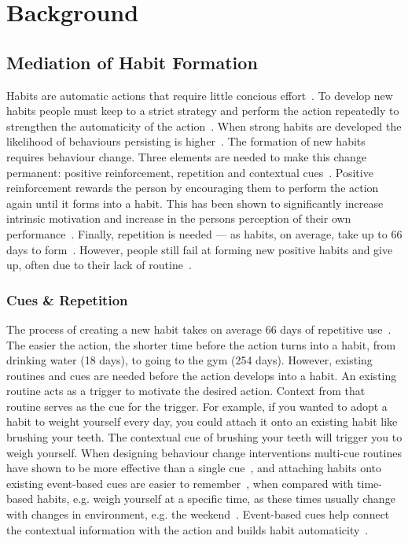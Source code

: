 \documentclass{scaffold/sigchi}
\begin{document}
\section{Background}
\subsection{Mediation of Habit Formation}
Habits are automatic actions that require little concious effort~\cite{article_the_habitual_consumer}. To develop new habits people must keep to a strict strategy and perform the action repeatedly to strengthen the automaticity of the action~\cite{article_promoting_habit_formation}. When strong habits are developed the likelihood of behaviours persisting is higher~\cite{putting_habit_into_practice}. The formation of new habits requires behaviour change. Three elements are needed to make this change permanent: positive reinforcement, repetition and contextual cues~\cite{article_experiences_of_habit_formation}. Positive reinforcement rewards the person by encouraging them to perform the action again until it forms into a habit. This has been shown to significantly increase intrinsic motivation and increase in the persons perception of their own performance~\cite{positive_reinforcement_pro}. Finally, repetition is needed --- as habits, on average, take up to 66 days to form~\cite{article_how_habits_formed_modelling_habit_formation}.
However, people still fail at forming new positive habits and give up, often due to their lack of routine~\cite{article_promoting_habit_formation, article_the_habitual_consumer}.



\subsubsection{Cues \& Repetition}
The process of creating a new habit takes on average 66 days of repetitive use~\cite{article_how_habits_formed_modelling_habit_formation}. The easier the action, the shorter time before the action turns into a habit, from drinking water (18 days), to going to the gym (254 days). However, existing routines and cues are needed before the action develops into a habit. An existing routine acts as a trigger to motivate the desired action. Context from that routine serves as the cue for the trigger. For example, if you wanted to adopt a habit to weight yourself every day, you could attach it onto an existing habit like brushing your teeth. The contextual cue of brushing your teeth will trigger you to weigh yourself. When designing behaviour change interventions multi-cue routines have shown to be more effective than a single cue~\cite{article_understanding_use_contextual_cues_design_impl}, and attaching habits onto existing event-based cues are easier to remember~\cite{article_implementation_intentions_multicue}, when compared with time-based habits, e.g. weigh yourself at a specific time, as these times usually change with changes in environment, e.g. the weekend~\cite{coaching_not_that_good}. Event-based cues help connect the contextual information with the action and builds habit automaticity~\cite{article_implementation_intentions}.
\end{document}
